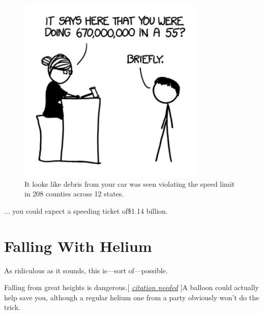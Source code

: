 {\begin{figure}[!htbp]
\centering
\includegraphics[scale=0.5, max width=0.8\textwidth]{imgs/a/61/speedbump_city.png}
\caption{It looks like debris from your car was seen violating the speed limit in 208 counties across 12 states.}
\end{figure}

{... you could expect a speeding ticket of\$1.14 billion.}

{
\chapter{Falling With Helium}
}

\hfill{}

{As ridiculous as it sounds, this is—sort of—possible.}

{Falling from great heights is dangerous.[ \emph{ \href{https://en.wikipedia.org/wiki/Philippine\_Republic\_Presidential\_Unit\_Citation}{citation needed}} ]A balloon could actually help save you, although a regular helium one from a party obviously won't do the trick.}

}

